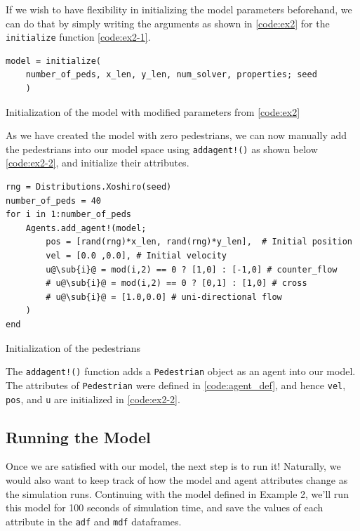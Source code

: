 If we wish to have flexibility in initializing the model parameters beforehand, we can do that by simply writing the arguments as shown in \autoref{code:ex2} for the \texttt{initialize} function \autoref{code:ex2-1}.
\begin{listing}[H]
\begin{verbatim}
model = initialize(
    number_of_peds, x_len, y_len, num_solver, properties; seed
    )
\end{verbatim}
\caption{Initialization of the model with modified parameters from \autoref{code:ex2}}
\label{code:ex2-1}
\end{listing}
As we have created the model with zero pedestrians, we can now manually add the pedestrians into our model space using \texttt{addagent!()} as shown below \autoref{code:ex2-2}, and initialize their attributes.

\begin{listing}[H]
\begin{verbatim}
rng = Distributions.Xoshiro(seed)
number_of_peds = 40
for i in 1:number_of_peds
    Agents.add_agent!(model;
        pos = [rand(rng)*x_len, rand(rng)*y_len],  # Initial position
        vel = [0.0 ,0.0], # Initial velocity
        u@\sub{i}@ = mod(i,2) == 0 ? [1,0] : [-1,0] # counter_flow
        # u@\sub{i}@ = mod(i,2) == 0 ? [0,1] : [1,0] # cross
        # u@\sub{i}@ = [1.0,0.0] # uni-directional flow
    )
end
\end{verbatim}
\caption{Initialization of the pedestrians}
\label{code:ex2-2}
\end{listing}

The \texttt{addagent!()} function adds a \texttt{Pedestrian} object as an agent into our model. The attributes of \texttt{Pedestrian} were defined in \autoref{code:agent_def}, and hence \texttt{vel}, \texttt{pos}, and \texttt{u} are initialized in \autoref{code:ex2-2}.
    
\subsection{Running the Model}
Once we are satisfied with our model, the next step is to run it! Naturally, we would also want to keep track of how the model and agent attributes change as the simulation runs. Continuing with the model defined in Example 2, we'll run this model for 100 seconds of simulation time, and save the values of each attribute in the \texttt{adf} and \texttt{mdf} dataframes.

